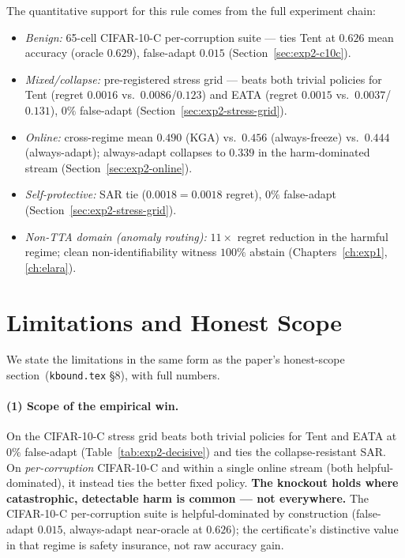 The quantitative support for this rule comes from the full experiment chain:
\begin{itemize}
\item \emph{Benign:} 65-cell CIFAR-10-C per-corruption suite --- \KGA{} ties Tent
  at $0.626$ mean accuracy (oracle $0.629$), false-adapt $0.015$
  (Section~\ref{sec:exp2-c10c}).
\item \emph{Mixed/collapse:} pre-registered stress grid --- \KGA{} beats both
  trivial policies for Tent (regret $0.0016$ vs.\ $0.0086$/$0.123$) and EATA
  (regret $0.0015$ vs.\ $0.0037$/$0.131$), $0\%$ false-adapt
  (Section~\ref{sec:exp2-stress-grid}).
\item \emph{Online:} cross-regime mean $0.490$ (KGA) vs.\ $0.456$ (always-freeze)
  vs.\ $0.444$ (always-adapt); always-adapt collapses to $0.339$ in the harm-dominated
  stream (Section~\ref{sec:exp2-online}).
\item \emph{Self-protective:} SAR tie ($0.0018 = 0.0018$ regret), $0\%$ false-adapt
  (Section~\ref{sec:exp2-stress-grid}).
\item \emph{Non-TTA domain (anomaly routing):} $11{\times}$ regret reduction in the
  harmful regime; clean non-identifiability witness $100\%$ abstain (Chapters~\ref{ch:exp1},
  \ref{ch:elara}).
\end{itemize}

\section{Limitations and Honest Scope}\label{sec:disc-limitations}

We state the limitations in the same form as the paper's honest-scope
section~(\texttt{kbound.tex} \S{}8), with full numbers.

\paragraph{(1) Scope of the empirical win.}
On the CIFAR-10-C stress grid \KGA{} beats both trivial policies for Tent and
EATA at $0\%$ false-adapt (Table~\ref{tab:exp2-decisive}) and ties the
collapse-resistant SAR.  On \emph{per-corruption} CIFAR-10-C and within a single
online stream (both helpful-dominated), it instead ties the better fixed policy.
\textbf{The knockout holds where catastrophic, detectable harm is common --- not
everywhere.}  The CIFAR-10-C per-corruption suite is helpful-dominated by
construction (false-adapt $0.015$, always-adapt near-oracle at $0.626$); the
certificate's distinctive value in that regime is safety insurance, not raw accuracy
gain.

